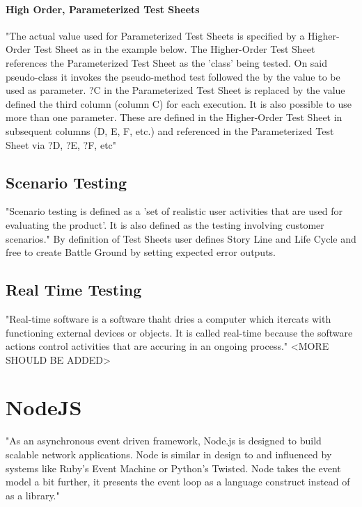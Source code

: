 \documentclass{llncs}
\begin{document}

\paragraph{High Order, Parameterized Test Sheets}
"The actual value used for Parameterized Test Sheets is specified by a Higher-Order Test Sheet as in the example below. 
The Higher-Order Test Sheet references the Parameterized Test Sheet as the 'class' being tested. 
On said pseudo-class it invokes the pseudo-method test followed the by the value to be used as parameter. 
?C in the Parameterized Test Sheet is replaced by the value defined the third column (column C) for each execution.
It is also possible to use more than one parameter. These are defined in the Higher-Order Test Sheet in subsequent columns (D, E, F, etc.) and referenced in the Parameterized Test Sheet via ?D, ?E, ?F, etc"\cite{tsh}


\subsection{Scenario Testing}
"Scenario testing is defined as a 'set of realistic user activities that are used for evaluating the product'. It is also defined as the testing involving customer scenarios."\cite{desikan}
By definition of Test Sheets user defines Story Line and Life Cycle and free to create Battle Ground by setting expected error outputs. \cite{desikan}

\subsection{Real Time Testing}
"Real-time software is a software thaht dries a computer which itercats  with functioning external devices or objects. It is called real-time because the software actions control activities that are accuring in an ongoing process."\cite{RealTimeTesting}
<MORE SHOULD BE ADDED>



\section{NodeJS}
"As an asynchronous event driven framework, Node.js is designed to build scalable network applications. 
Node is similar in design to and influenced by systems like Ruby's Event Machine or Python's Twisted. 
Node takes the event model a bit further, it presents the event loop as a language construct instead of as a library." \cite{nodejsabout}
\end{document}
